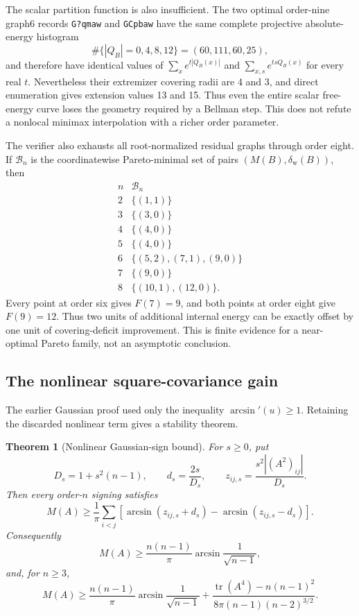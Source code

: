 \documentclass[11pt]{article}
\newtheorem{theorem}{Theorem}
\begin{document}
The scalar partition function is also insufficient.  The two optimal
order-nine graph6 records \texttt{G?qmaw} and \texttt{GCpbaw} have the same
complete projective absolute-energy histogram
\[
 \#\{|Q_B|=0,4,8,12\}=(60,111,60,25),
\]
and therefore have identical values of
$\sum_xe^{t|Q_B(x)|}$ and $\sum_{x,s}e^{tsQ_B(x)}$ for every real $t$.
Nevertheless their extremizer covering radii are 4 and 3, and direct
enumeration gives extension values 13 and 15.  Thus even the entire scalar
free-energy curve loses the geometry required by a Bellman step.  This does
not refute a nonlocal minimax interpolation with a richer order parameter.

The verifier also exhausts all root-normalized residual graphs through order
eight.  If $\mathcal B_n$ is the coordinatewise Pareto-minimal set of pairs
$(M(B),\delta_{\mathrm w}(B))$, then
\[
\begin{array}{c|c}
n&\mathcal B_n\\ \hline
2&\{(1,1)\}\\
3&\{(3,0)\}\\
4&\{(4,0)\}\\
5&\{(4,0)\}\\
6&\{(5,2),(7,1),(9,0)\}\\
7&\{(9,0)\}\\
8&\{(10,1),(12,0)\}.
\end{array}
\]
Every point at order six gives $F(7)=9$, and both points at order eight give
$F(9)=12$.  Thus two units of additional internal energy can be exactly
offset by one unit of covering-deficit improvement.  This is finite evidence
for a near-optimal Pareto family, not an asymptotic conclusion.

\subsection{The nonlinear square-covariance gain}

The earlier Gaussian proof used only the inequality $\arcsin'(u)\ge1$.
Retaining the discarded nonlinear term gives a stability theorem.

\begin{theorem}[Nonlinear Gaussian-sign bound]
\label{thm:nonlinear-gaussian}
For $s\ge0$, put
\[
 D_s=1+s^2(n-1),\qquad d_s=\frac{2s}{D_s},\qquad
 z_{ij,s}=\frac{s^2|(A^2)_{ij}|}{D_s}.
\]
Then every order-$n$ signing satisfies
\[
 M(A)\ge\frac1\pi\sum_{i<j}
 \left[\arcsin(z_{ij,s}+d_s)-\arcsin(z_{ij,s}-d_s)\right].
 \tag{25}
\]
Consequently
\[
 M(A)\ge\frac{n(n-1)}\pi\arcsin\frac1{\sqrt{n-1}},
 \tag{26}
\]
and, for $n\ge3$,
\[
 M(A)\ge\frac{n(n-1)}\pi\arcsin\frac1{\sqrt{n-1}}
 +\frac{\operatorname{tr}(A^4)-n(n-1)^2}
 {8\pi(n-1)(n-2)^{3/2}}.
 \tag{27}
\]
\end{theorem}
\end{document}
